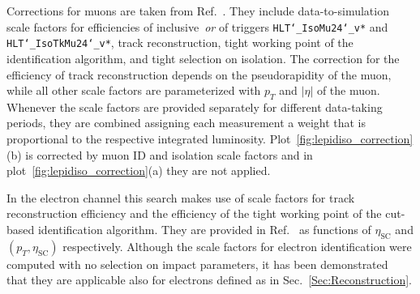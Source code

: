 Corrections for muons are taken from Ref.~\cite{Wiki:MuonSF}.
They include data-to-simulation scale factors for efficiencies of inclusive~\textit{or} of triggers \texttt{HLT\char`_IsoMu24\char`_v*} and \texttt{HLT\char`_IsoTkMu24\char`_v*}, track reconstruction, tight working point of the identification algorithm, and tight selection on isolation.
The correction for the efficiency of track reconstruction depends on the pseudorapidity of the muon, while all other scale factors are parameterized with $p_{T}$ and $|\eta|$ of the muon.
Whenever the scale factors are provided separately for different data-taking periods, they are combined assigning each measurement a weight that is proportional to the respective integrated luminosity. Plot~\ref{fig:lepidiso_correction}(b) is corrected by muon ID and isolation scale factors and in plot~\ref{fig:lepidiso_correction}(a) they are not applied.

In the electron channel this search makes use of scale factors for track reconstruction efficiency and the efficiency of the tight working point of the cut-based identification algorithm.
They are provided in Ref.~\cite{Wiki:ElectronSF} as functions of $\eta_\text{SC}$ and $(p_{T}, \eta_\text{SC})$ respectively. Although the scale factors for electron identification were computed with no selection on impact parameters, it has been demonstrated~\cite{Talk:EleSFImpactParameters} that they are applicable also for electrons defined as in Sec.~\ref{Sec:Reconstruction}.


